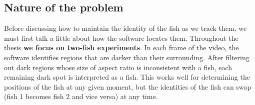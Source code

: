 \documentclass{article}
\begin{document}
\subsection{Nature of the problem}

Before discussing how to maintain the identity of the fish as we track them, we must first talk a little about how the software locates them. Throughout the thesis {\bf we focus on two-fish experiments}. 
In each frame of the video, the software identifies regions that are darker than their surrounding. After filtering out dark regions whose size of aspect ratio is inconsistent with a fish, each remaining dark spot is interpreted as a fish. This works well for determining the positions of the fish at any given moment, but the identities of the fish can swap (fish 1 becomes fish 2 and vice versa) at any time.
\end{document}
